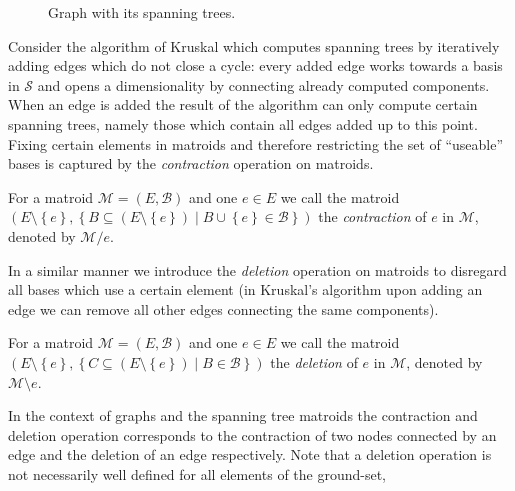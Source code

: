 \documentclass{scrartcl}
\theoremstyle{nonumberplain}
\newcommand{\tupel}[1]{\left(#1\right)}
\newcommand{\set}[1]{\left\{#1\right\}}
\begin{document}
\begin{figure}
  \begin{center}
  \end{center}
  \caption{Graph with its spanning trees.}
  \label{fig:spanning}
\end{figure}
Consider the algorithm of Kruskal \cite{kruskal} which computes spanning trees
by iteratively adding edges which do not close a cycle: every added edge works
towards a basis in $\mathcal{S}$ and opens a dimensionality by connecting
already computed components. When an edge is added the result of the algorithm
can only compute certain spanning trees, namely those which contain all edges
added up to this point. Fixing certain elements in matroids and therefore
restricting the set of \enquote{useable} bases is captured by the
\emph{contraction} operation on matroids.
\begin{defi}
  For a matroid $\mathcal{M} = \tupel{E, \mathcal{B}}$ and one $e\in E$ we call
  the matroid $\tupel{E\setminus\set{e}, \set{B\subseteq
  (E\setminus\set{e})\middle| B\cup\set{e}\in\mathcal{B}}}$ the
  \emph{contraction} of $e$ in $\mathcal{M}$, denoted by $\mathcal{M}/e$.
\end{defi}
In a similar manner we introduce the \emph{deletion} operation on matroids to
disregard all bases which use a certain element (in Kruskal's algorithm upon
adding an edge we can remove all other edges connecting the same components).
\begin{defi}
  For a matroid $\mathcal{M} = \tupel{E, \mathcal{B}}$ and one $e\in E$ we call
  the matroid $\tupel{E\setminus\set{e}, \set{C\subseteq
  (E\setminus\set{e})\middle| B\in\mathcal{B}}}$ the \emph{deletion} of $e$ in
  $\mathcal{M}$, denoted by $\mathcal{M}\setminus e$.
\end{defi}
In the context of graphs and the spanning tree matroids the contraction and
deletion operation corresponds to the contraction of two nodes connected by
an edge and the deletion of an edge respectively. Note that a deletion
operation is not necessarily well defined for all elements of the ground-set,
\end{document}
